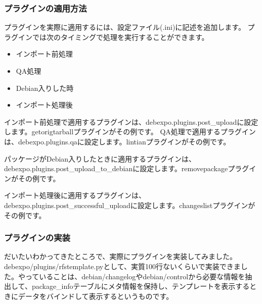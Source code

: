 \documentclass[mingoth,a4paper]{jsarticle}
\begin{document}

\subsubsection{プラグインの適用方法}

プラグインを実際に適用するには、設定ファイル(.ini)に記述を追加します。
プラグインでは次のタイミングで処理を実行することができます。

\begin{itemize}
\item インポート前処理
\item QA処理
\item Debian入りした時
\item インポート処理後
\end{itemize}

インポート前処理で適用するプラグインは、debexpo.plugins.post\_uploadに設定します。getorigtarballプラグインがその例です。
QA処理で適用するプラグインは、debexpo.plugins.qaに設定します。lintianプラグインがその例です。

パッケージがDebian入りしたときに適用するプラグインは、debexpo.plugins.post\_upload\_to\_debianに設定します。removepackageプラグインがその例です。

インポート処理後に適用するプラグインは、debexpo.plugins.post\_successful\_uploadに設定します。changeslistプラグインがその例です。

\subsubsection{プラグインの実装}

だいたいわかってきたところで、実際にプラグインを実装してみました。
debexpo/plugins/rfstemplate.pyとして、実質100行ないくらいで実装できました。やっていることは、debian/changelogやdebian/controlから必要な情報を抽出して、package\_infoテーブルにメタ情報を保持し、テンプレートを表示するときにデータをバインドして表示するというものです。
\end{document}

